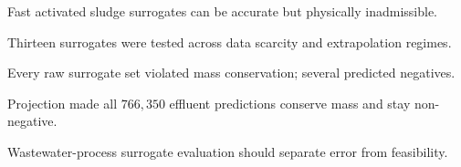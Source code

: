 \documentclass[a4paper,fleqn]{cas-sc}
\title[mode=title]{}
\author{}
\begin{document}
\begin{highlights}
\item Fast activated sludge surrogates can be accurate but physically inadmissible.
\item Thirteen surrogates were tested across data scarcity and extrapolation regimes.
\item Every raw surrogate set violated mass conservation; several predicted negatives.
\item Projection made all $766{,}350$ effluent predictions conserve mass and stay non-negative.
\item Wastewater-process surrogate evaluation should separate error from feasibility.
\end{highlights}

\thispagestyle{empty}
\unvbox\casauhlbox
\end{document}

